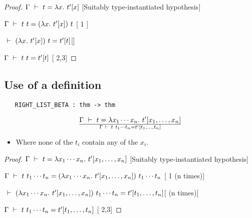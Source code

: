 \vspace{12pt plus2pt minus1pt}

\begin{proof}
\item $\Gamma\ \vdash\  t = \lambda x.\  t'[x]$\hfill
[Suitably type-instantiated hypothesis]
\item $\Gamma\ \vdash\  t\ t =
(\lambda x.\ t'[x])\ t$\hfill
[ 1 ]
\item $\ \vdash\ (\lambda x.\ t'[x])\ t =
t'[t]$\hfill []
\item $\Gamma\ \vdash\  t\ t = t'[t]$\hfill
[ 2,3]
\end{proof}


\subsection{Use of a definition}

\begin{holboxed}
\begin{verbatim}
   RIGHT_LIST_BETA : thm -> thm
\end{verbatim}\end{holboxed}

\vspace{12pt plus2pt minus1pt}

$$\Gamma\ \vdash\  t = \lambda x_1\cdots x_n.\ t'[x_1,\ldots,x_n]
\over \Gamma\ \vdash\  t\ t_1\cdots t_n = t'[t_1,\ldots,t_n]$$
\begin{itemize}
\item Where none of the $t_i$ contain any of the $x_i$.
\end{itemize}

\vspace{12pt plus2pt minus1pt}

\begin{proof}
\item $\Gamma\ \vdash\  t = \lambda x_1\cdots x_n.\  t'[x_1,\ldots,x_n]$\hfill
[Suitably type-instantiated hypothesis]
\item $\Gamma\ \vdash\  t\ t_1\cdots t_n =
(\lambda x_1\cdots x_n.\ t'[x_1,\ldots,x_n])\ t_1\cdots t_n$\hfill
[ 1 (n times)]
\item $\ \vdash\ (\lambda x_1\cdots x_n.\ t'[x_1,\ldots,x_n])\ t_1\cdots t_n =
t'[t_1,\ldots,t_n]$\hfill [ (n times)]
\item $\Gamma\ \vdash\  t\ t_1\cdots t_n = t'[t_1,\ldots,t_n]$\hfill
[ 2,3]
\end{proof}





